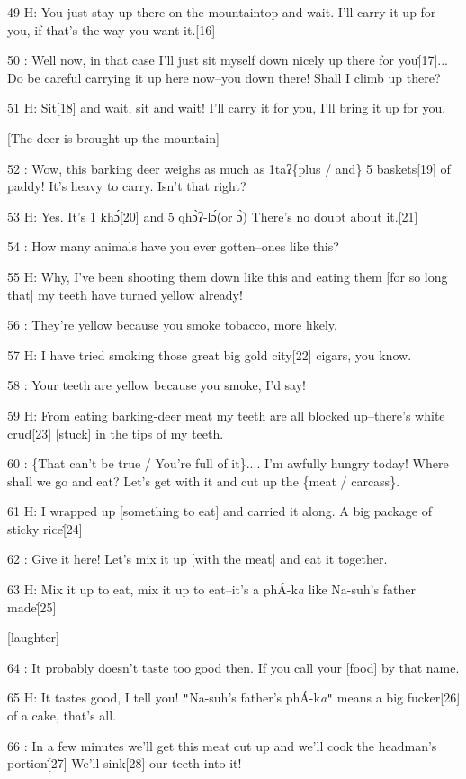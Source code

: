 49 H: You just stay up there on the mountaintop and wait. I'll carry it up for
you, if that's the way you want it.[16]

50  : Well now, in that case I'll just sit myself down nicely up there for you\.[17]...
Do be careful carrying it up here now--you down there! Shall I climb up there?

51 H: Sit[18] and wait, sit and wait! I'll carry it for you, I'll bring it up for
you.

[The deer is brought up the mountain]

52  : Wow, this barking  deer weighs as much as 1taʔ\{plus / and\} 5 baskets[19]
of paddy! It's heavy to carry. Isn't that right?

53 H: Yes. It's 1 khɔ́[20] and 5 qhɔ̀ʔ-lɔ́(or ɔ̀) There's no doubt about
it.[21]

54  : How many animals have you ever gotten--ones like this?

55 H: Why, I've been shooting them down like this and eating them [for so long
that] my teeth have turned yellow already!

56  : They're yellow because you smoke tobacco, more likely.

57 H: I have tried smoking those great big gold city[22] cigars, you know.

58  : Your teeth are yellow because you smoke, I'd say!

59 H: From eating barking-deer meat my teeth are all blocked up--there's white
crud[23] [stuck] in the tips of my teeth.

60  : \{That can't be true / You're full of it\}.... I'm awfully hungry today!
Where shall we go and eat? Let's get with it and cut up the \{meat / carcass\}.

61 H: I wrapped up [something to eat] and carried it along. A big package of sticky
rice\.[24]

62  : Give it here! Let's mix it up [with the meat] and eat it together.

63 H: Mix it up to eat, mix it up to eat--it's a phÁ-k\emph{a} like Na-suh's father
made\.[25]

[laughter]

64  : It probably doesn't taste too good then. If you call your [food] by that
name.

65 H: It tastes good, I tell you! \texttt{"}Na-suh's father's phÁ-k\emph{a}\texttt{"}
means a big fucker[26] of a cake, that's all.

66  : In a few minutes we'll get this meat cut up and we'll cook the headman's
portion\.[27] We'll sink[28] our teeth into it!

